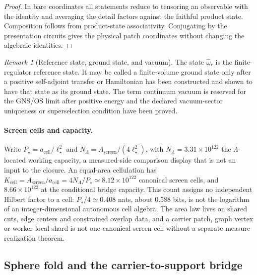 \documentclass[11pt]{article}
\theoremstyle{remark}
\newtheorem{remark}[theorem]{Remark}
\theoremstyle{plain}
\begin{document}
\begin{proof}
In bare coordinates all statements reduce to tensoring an observable with the identity and
averaging the detail factors against the faithful product state. Composition follows from
product-state associativity. Conjugating by the presentation circuits gives the physical patch
coordinates without changing the algebraic identities.
\end{proof}

\begin{remark}[Reference state, ground state, and vacuum]
The state \(\widehat\omega_r\) is the finite-regulator reference state. It may be called a
finite-volume ground state only after a positive self-adjoint transfer or Hamiltonian has been
constructed and shown to have that state as its ground state. The term continuum vacuum is reserved
for the GNS/OS limit after positive energy and the declared vacuum-sector uniqueness or
superselection condition have been proved.
\end{remark}

\paragraph{Screen cells and capacity.}
Write \(P_\star=a_{\mathrm{cell}}/\ell_\star^2\) and
\(N_\Lambda=A_{\mathrm{screen}}/(4\ell_\star^2)\), with
\(N_\Lambda=3.31\times10^{122}\) the \(\Lambda\)-located working capacity, a
measured-side comparison display that is not an input to the closure. An
equal-area cellulation has
\(K_{\mathrm{cell}}=A_{\mathrm{screen}}/a_{\mathrm{cell}}=4N_\Lambda/P_\star
\simeq8.12\times10^{122}\) canonical screen cells, and \(8.66\times10^{122}\)
at the conditional bridge capacity. This count assigns no independent Hilbert
factor to a cell: \(P_\star/4\simeq0.408\) nats, about \(0.588\) bits, is not
the logarithm of an integer-dimensional autonomous cell algebra. The area law
lives on shared cuts, edge centers and constrained overlap data, and a
carrier patch, graph vertex or worker-local shard is not one canonical screen
cell without a separate measure-realization theorem.

\subsection{Sphere fold and the carrier-to-support bridge}
\end{document}
